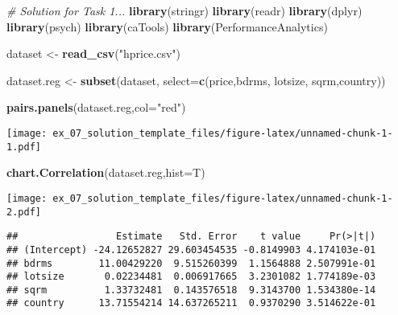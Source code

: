 \documentclass[11pt,]{article}
\newenvironment{Shaded}{\begin{snugshade}}{\end{snugshade}}
\newcommand{\CommentTok}[1]{\textcolor[rgb]{0.56,0.35,0.01}{\textit{#1}}}
\newcommand{\DataTypeTok}[1]{\textcolor[rgb]{0.13,0.29,0.53}{#1}}
\newcommand{\KeywordTok}[1]{\textcolor[rgb]{0.13,0.29,0.53}{\textbf{#1}}}
\newcommand{\NormalTok}[1]{#1}
\newcommand{\OperatorTok}[1]{\textcolor[rgb]{0.81,0.36,0.00}{\textbf{#1}}}
\newcommand{\StringTok}[1]{\textcolor[rgb]{0.31,0.60,0.02}{#1}}
\begin{document}
\begin{Shaded}
\begin{Highlighting}[]
\CommentTok{# Solution for Task 1...}
\KeywordTok{library}\NormalTok{(stringr)}
\KeywordTok{library}\NormalTok{(readr)}
\KeywordTok{library}\NormalTok{(dplyr)}
\KeywordTok{library}\NormalTok{(psych)}
\KeywordTok{library}\NormalTok{(caTools)}
\KeywordTok{library}\NormalTok{(PerformanceAnalytics)}

\NormalTok{dataset <-}\StringTok{ }\KeywordTok{read_csv}\NormalTok{(}\StringTok{"hprice.csv"}\NormalTok{)}

\NormalTok{dataset.reg <-}\StringTok{ }\KeywordTok{subset}\NormalTok{(dataset, }\DataTypeTok{select=}\KeywordTok{c}\NormalTok{(price,bdrms, lotsize, sqrm,country))}

\KeywordTok{pairs.panels}\NormalTok{(dataset.reg,}\DataTypeTok{col=}\StringTok{"red"}\NormalTok{)}
\end{Highlighting}
\end{Shaded}

\texttt{[image: ex\_07\_solution\_template\_files/figure-latex/unnamed-chunk-1-1.pdf]}

\begin{Shaded}
\begin{Highlighting}[]
\KeywordTok{chart.Correlation}\NormalTok{(dataset.reg,}\DataTypeTok{hist=}\NormalTok{T)}
\end{Highlighting}
\end{Shaded}

\texttt{[image: ex\_07\_solution\_template\_files/figure-latex/unnamed-chunk-1-2.pdf]}

\begin{Shaded}
\end{Shaded}

\begin{verbatim}
##                 Estimate   Std. Error    t value     Pr(>|t|)
## (Intercept) -24.12652827 29.603454535 -0.8149903 4.174103e-01
## bdrms        11.00429220  9.515260399  1.1564888 2.507991e-01
## lotsize       0.02234481  0.006917665  3.2301082 1.774189e-03
## sqrm          1.33732481  0.143576518  9.3143700 1.534380e-14
## country      13.71554214 14.637265211  0.9370290 3.514622e-01
\end{verbatim}
\end{document}
